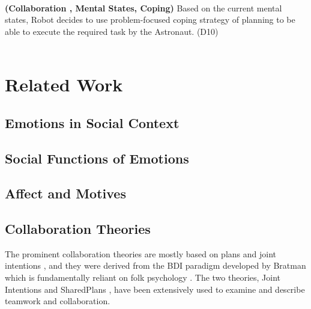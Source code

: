 \noindent{}\\
  
\noindent\textbf{(Collaboration , Mental States, Coping)} Based on the current
mental states, Robot decides to use problem-focused coping strategy of planning
to be able to execute the required task by the Astronaut. (D10)\\

\noindent{}\\  
  
\noindent{}

\section{Related Work}

\subsection{Emotions in Social Context}

\subsection{Social Functions of Emotions}

\subsection{Affect and Motives}

\subsection{Collaboration Theories}
\label{sec:collaboration-theory}

The prominent collaboration theories are mostly based on plans and joint
intentions
\cite{cohen:teamwork,grosz:plans-discourse,Litman:discourse-commonsense}, and
they were derived from the BDI paradigm developed by Bratman
\cite{bratman:intentions-plans} which is fundamentally reliant on folk
psychology \cite{ravenscroft:folk}. The two theories, Joint Intentions
\cite{cohen:teamwork} and SharedPlans \cite{grosz:plans-discourse}, have been
extensively used to examine and describe teamwork and collaboration.

